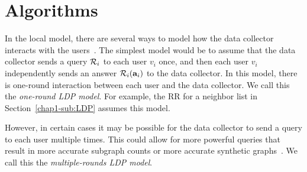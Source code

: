 \section{Algorithms}
\label{chap1-sec:algorithms}
In the local model, 
there 
are several ways 
to 
model how the data collector interacts with 
the users~\cite{Duchi_FOCS13,Joseph_SODA20,Qin_CCS17}.
The simplest model 
would be 
to assume that 
the data collector sends 
a 
query $\mathcal{R}_i$ to each user $v_i$ once, 
and then 
each user $v_i$ independently sends an answer $\mathcal{R}_i(\mathbf{a}_i)$ to the data collector. 
In this model, there is one-round interaction between each user and the data collector. 
We call this the
\textit{one-round LDP model}. 
For example, the RR 
for a neighbor list in Section~\ref{chap1-sub:LDP} assumes this model.

However, in certain cases it may be possible 
for the data collector to send a query to each user multiple times. 
This could allow for more powerful queries that result in more accurate 
subgraph counts 
\cite{Sun_CCS19} 
or more accurate synthetic graphs~\cite{Qin_CCS17}. 
We call this the \textit{multiple-rounds LDP model}. 


